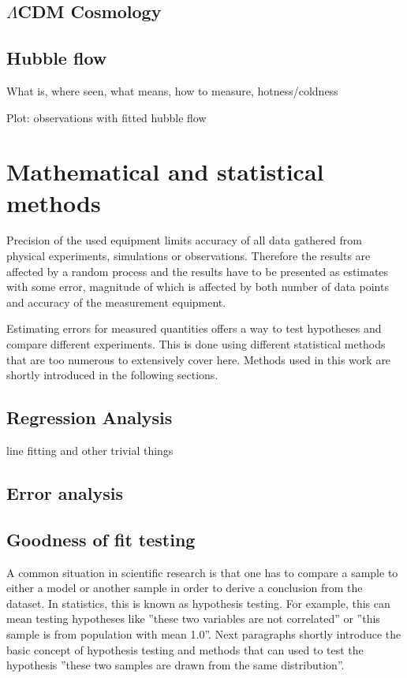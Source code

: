 \documentclass[english, oneside]{HYgradu}
\begin{document}
\subsection{$\Lambda$CDM Cosmology}


\subsection{Hubble flow}
What is, where seen, what means, how to measure, hotness/coldness

Plot: observations with fitted hubble flow


\section{Mathematical and statistical methods}
Precision of the used equipment limits accuracy of all data gathered from physical experiments, simulations or observations. Therefore the results are affected by a random process and the results have to be presented as estimates with some error, magnitude of which is affected by both number of data points and accuracy of the measurement equipment. \cite{bohm2010introduction}

Estimating errors for measured quantities offers a way to test hypotheses and compare different experiments\cite{bohm2010introduction}. This is done using different statistical methods that are too numerous to extensively cover here. Methods used in this work are shortly introduced in the following sections.

\subsection{Regression Analysis}
line fitting and other trivial things

\subsection{Error analysis}

\subsection{Goodness of fit testing}
A common situation in scientific research is that one has to compare a sample to either a model or another sample in order to derive a conclusion from the dataset. In statistics, this is known as hypothesis testing. For example, this can mean testing hypotheses like ''these two variables are not correlated'' or ''this sample is from population with mean 1.0''. \cite{wall2003practical} Next paragraphs shortly introduce the basic concept of hypothesis testing and methods that can used to test the hypothesis ''these two samples are drawn from the same distribution''.
\end{document}
